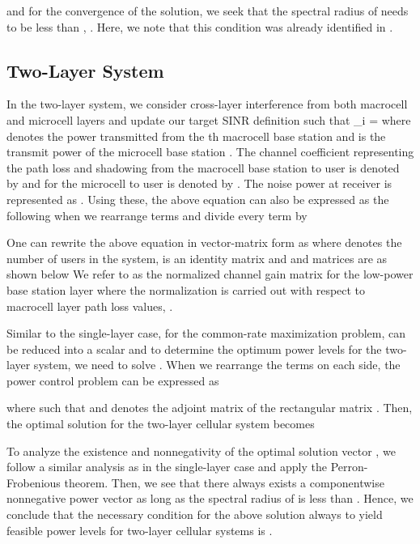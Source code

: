 \documentclass[conference,letterpaper,final,10pt]{IEEEtran}
\newcommand{\bea}{}
\begin{document}
and for the convergence of the solution, we seek that the spectral radius of  needs to be less than , . Here, we note that this condition was already identified in \cite{ZanderCentral,Zender,Goodman,Foschini,GoodmanDPC}.
\subsection{Two-Layer System}
In the two-layer system, we consider cross-layer interference from both macrocell and microcell
layers and update our target SINR definition such that
\bea \gamma_i =  \eea where
 denotes the power transmitted from the th macrocell base
station and  is the transmit power of the microcell base
station . The channel coefficient representing the path loss and shadowing from the macrocell base station  to user  is denoted by  and for the microcell  to user  is denoted by . The noise power at receiver  is represented as . Using these, the above equation can also be expressed as the following when we rearrange terms and divide every term by

 One can rewrite
the above equation in vector-matrix form as  where  denotes the number of users in
the system,  is an  identity matrix and
 and  matrices are as shown below
 We refer to  as the normalized channel gain matrix for the low-power base station
layer where the normalization is carried out with respect to macrocell layer path loss values, .

Similar to the single-layer case, for the common-rate maximization problem,  can be reduced into a scalar  and to determine the optimum power levels for the two-layer system, we need to solve . When we rearrange the terms on each side, the power control problem can
be expressed as

where  such that  and
 denotes the adjoint matrix of the rectangular matrix . Then, the
optimal solution for the two-layer cellular system becomes

To analyze the existence and nonnegativity of the optimal solution vector , we follow a similar analysis as
in the single-layer case and apply the Perron-Frobenious theorem. Then, we see that there always exists a componentwise
nonnegative power vector  as long as the spectral radius of  is less than . Hence, we conclude that the necessary condition for the above solution always to yield feasible power levels for two-layer cellular systems is .
\end{document}
